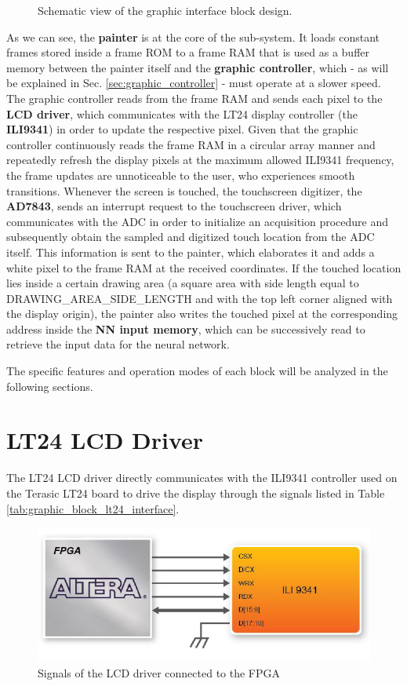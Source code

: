 \documentclass[11pt]{report}
\begin{document}
\begin{figure}[!h]
\label{fig:graphic_interface_diagram}
\caption{Schematic view of the graphic interface block design.}
\end{figure}

As we can see, the \textbf{painter} is at the core of the sub-system. It loads constant frames stored inside a frame ROM to a frame RAM that is used as a buffer memory between the painter itself and the \textbf{graphic controller}, which - as will be explained in Sec. \ref{sec:graphic_controller} - must operate at a slower speed. The graphic controller reads from the frame RAM and sends each pixel to the \textbf{LCD driver}, which communicates with the LT24 display controller (the \textbf{ILI9341}) in order to update the respective pixel. Given that the graphic controller continuously reads the frame RAM in a circular array manner and repeatedly refresh the display pixels at the maximum allowed ILI9341 frequency, the frame updates are unnoticeable to the user, who experiences smooth transitions. Whenever the screen is touched, the touchscreen digitizer, the \textbf{AD7843}, sends an interrupt request to the touchscreen driver, which communicates with the ADC in order to initialize an acquisition procedure and subsequently obtain the sampled and digitized touch location from the ADC itself. This information is sent to the painter, which elaborates it and adds a white pixel to the frame RAM at the received coordinates. If the touched location lies inside a certain drawing area (a square area with side length equal to DRAWING\_AREA\_SIDE\_LENGTH and with the top left corner aligned with the display origin), the painter also writes the touched pixel at the corresponding address inside the \textbf{NN input memory}, which can be successively read to retrieve the input data for the neural network.

The specific features and operation modes of each block will be analyzed in the following sections.

\section{LT24 LCD Driver}\label{sec:lt24_lcd_driver}
The LT24 LCD driver directly communicates with the ILI9341 controller used on the Terasic LT24 board to drive the display through the signals listed in Table \ref{tab:graphic_block_lt24_interface}.

\begin{figure}[!h]
    \centering
    \includegraphics[width=1\linewidth]{images/graphic_interface_design/LT24_LCD_driver/ili9341_connections.png}
    \caption{Signals of the LCD driver connected to the FPGA}
    \label{fig:ili9341_connections}
\end{figure}
\end{document}
